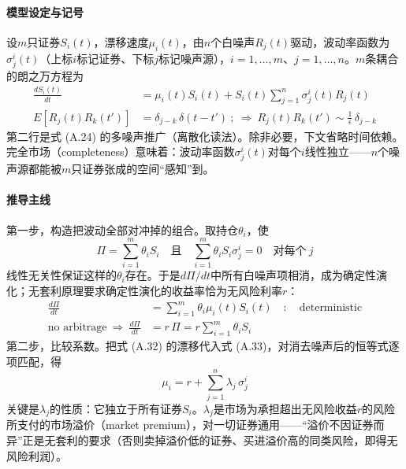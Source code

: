\paragraph{模型设定与记号}
设$m$只证券$S_i(t)$，漂移速度$\mu_i(t)$，由$n$个白噪声$R_j(t)$驱动，波动率函数为$\sigma^i_j(t)$（上标$i$标记证券、下标$j$标记噪声源），$i=1,\ldots,m$、$j=1,\ldots,n$。$m$条耦合的朗之万方程为
\begin{align*}
\frac{dS_i(t)}{dt}&=\mu_i(t)S_i(t)+S_i(t)\sum_{j=1}^{n}\sigma^i_j(t)R_j(t)\\
E[R_j(t)R_k(t')]&=\delta_{j-k}\,\delta(t-t')
\ ;\ \Rightarrow\
R_j(t)R_k(t')\sim\frac{1}{\epsilon}\,\delta_{j-k}
\tag{A.32}
\end{align*}
第二行是式 (A.24) 的多噪声推广（离散化读法）。除非必要，下文省略时间依赖。完全市场（completeness）意味着：波动率函数$\sigma^i_j(t)$对每个$i$线性独立——$n$个噪声源都能被$m$只证券张成的空间“感知”到。

\paragraph{推导主线}
第一步，构造把波动全部对冲掉的组合。取持仓$\theta_i$，使
\begin{equation*}
\Pi=\sum_{i=1}^{m}\theta_i S_i
\quad\text{且}\quad
\sum_{i=1}^{m}\theta_i S_i\sigma^i_j=0
\quad\text{对每个}\ j
\end{equation*}
线性无关性保证这样的$\theta_i$存在。于是$d\Pi/dt$中所有白噪声项相消，成为确定性演化；无套利原理要求确定性演化的收益率恰为无风险利率$r$：
\begin{align*}
\frac{d\Pi}{dt}&=\sum_{i=1}^{m}\theta_i\mu_i(t)S_i(t)
\quad:\quad\text{deterministic}\\
\text{no arbitrage}\ \Rightarrow\
\frac{d\Pi}{dt}&=r\,\Pi=r\sum_{i=1}^{m}\theta_i S_i
\tag{A.33}
\end{align*}
第二步，比较系数。把式 (A.32) 的漂移代入式 (A.33)，对消去噪声后的恒等式逐项匹配，得
\begin{equation*}
\mu_i=r+\sum_{j=1}^{n}\lambda_j\,\sigma^i_j
\tag{A.34}
\end{equation*}
关键是$\lambda_j$的性质：它独立于所有证券$S_i$。$\lambda_j$是市场为承担超出无风险收益$r$的风险所支付的市场溢价（market premium），对一切证券通用——“溢价不因证券而异”正是无套利的要求（否则卖掉溢价低的证券、买进溢价高的同类风险，即得无风险利润）。

